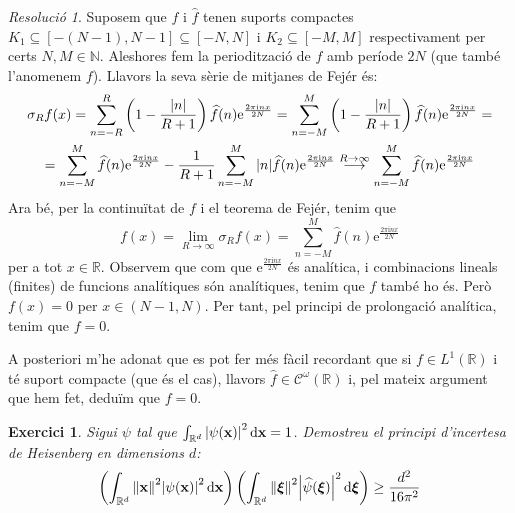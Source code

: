 \documentclass[10pt,a4paper]{article}
\newcommand{\NN}{\ensuremath{\mathbb{N}}} %
\newcommand{\RR}{\ensuremath{\mathbb{R}}} %
\newcommand{\vf}[1]{\boldsymbol{\mathrm{#1}}} %
\newcommand{\ii}{\mathrm{i}} %
\newtheorem{exercici}{Exercici}
\theoremstyle{definition}
\theoremstyle{remark}
\newtheorem*{res}{Resolució}
\renewcommand{\exp}[1]{\mathrm{e}^{#1}} %
\begin{document}
\begin{res}
  Suposem que $f$ i $\widehat{f}$ tenen suports compactes $K_1\subseteq [-(N-1),N-1]\subseteq [-N,N]$ i $K_2\subseteq [-M,M]$ respectivament per certs $N,M\in\NN$. Aleshores fem la periodització de $f$ amb període $2N$ (que també l'anomenem $f$). Llavors la seva sèrie de mitjanes de Fejér és:
  \begin{multline*}
    \sigma_Rf(x)=\sum_{n=-R}^{R}\left(1-\frac{\abs{n}}{R+1}\right)\widehat{f}(n)\exp{\frac{2\pi\ii n x}{2N}}=\sum_{n=-M}^{M}\left(1-\frac{\abs{n}}{R+1}\right)\widehat{f}(n)\exp{\frac{2\pi\ii n x}{2N}}=\\
    =\sum_{n=-M}^{M}\widehat{f}(n)\exp{\frac{2\pi\ii n x}{2N}}-\frac{1}{R+1}\sum_{n=-M}^{M}\abs{n}\widehat{f}(n)\exp{\frac{2\pi\ii n x}{2N}}\overset{R\to\infty}{\longrightarrow} \sum_{n=-M}^{M}\widehat{f}(n)\exp{\frac{2\pi\ii n x}{2N}}
  \end{multline*}
  Ara bé, per la continuïtat de $f$ i el teorema de Fejér, tenim que
  $$f(x)=\lim_{R\to\infty}\sigma_Rf(x)=\sum_{n=-M}^{M}\widehat{f}(n)\exp{\frac{2\pi\ii n x}{2N}}$$
  per a tot $x\in\RR$.
  Observem que com que $\exp{\frac{2\pi\ii n x}{2N}}$ és analítica, i combinacions lineals (finites) de funcions analítiques són analítiques, tenim que $f$ també ho és. Però $f(x)=0$ per $x\in(N-1,N)$. Per tant, pel principi de prolongació analítica, tenim que $f=0$.

  A posteriori m'he adonat que es pot fer més fàcil recordant que si $f\in L^1(\RR)$ i té suport compacte (que és el cas), llavors $\widehat{f}\in\mathcal{C}^\omega(\RR)$ i, pel mateix argument que hem fet, deduïm que $f=0$.
\end{res}
\begin{exercici}
  Sigui $\psi$ tal que $\int_{\RR^d}\abs{\psi(\vf{x})}^2\dd{\vf{x}}=1$. Demostreu el principi d'incertesa de Heisenberg en dimensions $d$:
  $$\left(\int_{\RR^d} \norm{\vf{x}}^2 \abs{\psi(\vf{x})}^2\dd{\vf{x}}\right)\left(\int_{\RR^d} \norm{\vf\xi}^2 \abs{\widehat{\psi}(\vf\xi)}^2\dd{\vf\xi}\right)\geq \frac{d^2}{16\pi^2}$$
\end{exercici}
\end{document}
